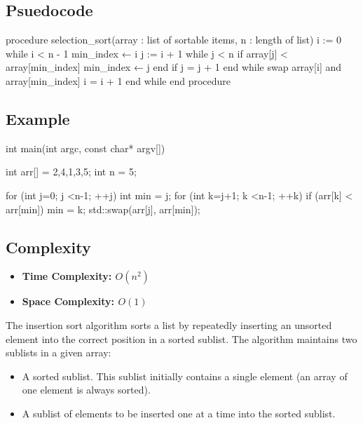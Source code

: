 \documentclass{report}
\begin{document}
    \subsection{Psuedocode}
    \begin{cppcode}
procedure selection_sort(array : list of sortable items, n : length of list)
    i := 0
    while i < n - 1
        min_index ← i
        j := i + 1
        while j < n
            if array[j] < array[min_index]
                min_index ← j
            end if
            j = j + 1
        end while
        swap array[i] and array[min_index]
        i = i + 1
    end while
end procedure
    \end{cppcode}

    \bigbreak \noindent 
    \subsection{Example}
    \begin{cppcode}
        int main(int argc, const char* argv[]) {
            int arr[] = {2,4,1,3,5}; int n = 5;

            for (int j=0; j <n-1; ++j) {
                int min = j;
                for (int k=j+1; k <n-1; ++k) {
                    if (arr[k] < arr[min]) {
                        min = k;
                    }
                }
                std::swap(arr[j], arr[min]);
            }
        }
    \end{cppcode}

    \pagebreak 
    \subsection{Complexity}
    \begin{itemize}
        \item \textbf{Time Complexity: $O(n^{2})$} 
        \item \textbf{Space Complexity: $O(1)$} 
    \end{itemize}
    \bigbreak \noindent 
    
    \pagebreak 
    \bigbreak \noindent 
    \begin{concept}
        The insertion sort algorithm sorts a list by repeatedly inserting an unsorted element into the correct position in a sorted sublist. The algorithm maintains two sublists in a given array:

        \begin{itemize}
            \item A sorted sublist. This sublist initially contains a single element (an array of one element is always sorted).
            \item A sublist of elements to be inserted one at a time into the sorted sublist.
        \end{itemize}
    \end{concept}
    \bigbreak \noindent 
\end{document}
